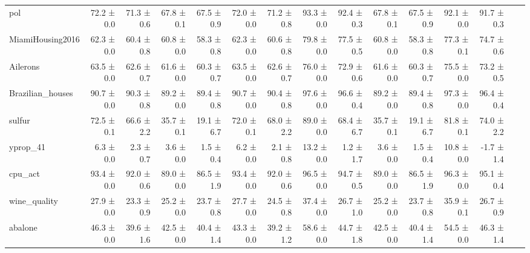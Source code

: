 \begin{table}
\begin{tabular}{l|rr|rr|rr||rr|rr|rr|rr}
pol & 72.2 ± 0.0 & 71.3 ± 0.6 & 67.8 ± 0.1 & 67.5 ± 0.9 & 72.0 ± 0.0 & 71.2 ± 0.8 & 93.3 ± 0.0 & 92.4 ± 0.3 & 67.8 ± 0.1 & 67.5 ± 0.9 & 92.1 ± 0.0 & 91.7 ± 0.3 \\
MiamiHousing2016 & 62.3 ± 0.0 & 60.4 ± 0.8 & 60.8 ± 0.0 & 58.3 ± 0.8 & 62.3 ± 0.0 & 60.6 ± 0.8 & 79.8 ± 0.0 & 77.5 ± 0.5 & 60.8 ± 0.0 & 58.3 ± 0.8 & 77.3 ± 0.1 & 74.7 ± 0.6 \\
Ailerons & 63.5 ± 0.0 & 62.6 ± 0.7 & 61.6 ± 0.0 & 60.3 ± 0.7 & 63.5 ± 0.0 & 62.6 ± 0.7 & 76.0 ± 0.0 & 72.9 ± 0.6 & 61.6 ± 0.0 & 60.3 ± 0.7 & 75.5 ± 0.0 & 73.2 ± 0.5 \\
Brazilian\_houses & 90.7 ± 0.0 & 90.3 ± 0.8 & 89.2 ± 0.0 & 89.4 ± 0.8 & 90.7 ± 0.0 & 90.4 ± 0.8 & 97.6 ± 0.0 & 96.6 ± 0.4 & 89.2 ± 0.0 & 89.4 ± 0.8 & 97.3 ± 0.0 & 96.4 ± 0.4 \\
sulfur & 72.5 ± 0.1 & 66.6 ± 2.2 & 35.7 ± 0.1 & 19.1 ± 6.7 & 72.0 ± 0.1 & 68.0 ± 2.2 & 89.0 ± 0.0 & 68.4 ± 6.7 & 35.7 ± 0.1 & 19.1 ± 6.7 & 81.8 ± 0.1 & 74.0 ± 2.2 \\
yprop\_41 & 6.3 ± 0.0 & 2.3 ± 0.7 & 3.6 ± 0.0 & 1.5 ± 0.4 & 6.2 ± 0.0 & 2.1 ± 0.8 & 13.2 ± 0.0 & 1.2 ± 1.7 & 3.6 ± 0.0 & 1.5 ± 0.4 & 10.8 ± 0.0 & -1.7 ± 1.4 \\
cpu\_act & 93.4 ± 0.0 & 92.0 ± 0.6 & 89.0 ± 0.0 & 86.5 ± 1.9 & 93.4 ± 0.0 & 92.0 ± 0.6 & 96.5 ± 0.0 & 94.7 ± 0.5 & 89.0 ± 0.0 & 86.5 ± 1.9 & 96.3 ± 0.0 & 95.1 ± 0.4 \\
wine\_quality & 27.9 ± 0.0 & 23.3 ± 0.9 & 25.2 ± 0.0 & 23.7 ± 0.8 & 27.7 ± 0.0 & 24.5 ± 0.8 & 37.4 ± 0.0 & 26.7 ± 1.0 & 25.2 ± 0.0 & 23.7 ± 0.8 & 35.9 ± 0.1 & 26.7 ± 0.9 \\
abalone & 46.3 ± 0.0 & 39.6 ± 1.6 & 42.5 ± 0.0 & 40.4 ± 1.4 & 43.3 ± 0.0 & 39.2 ± 1.2 & 58.6 ± 0.0 & 44.7 ± 1.8 & 42.5 ± 0.0 & 40.4 ± 1.4 & 54.5 ± 0.0 & 46.3 ± 1.4 \\
\hline
\end{tabular}
\end{table}
